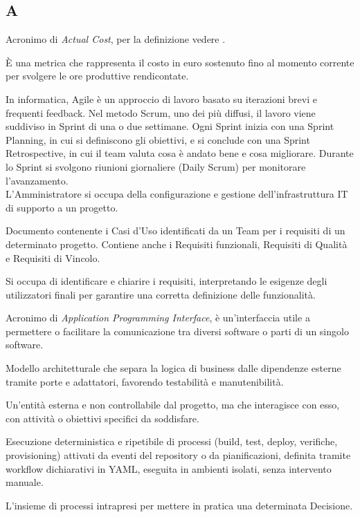 \begin{center}
\section*{A}
\end{center}

Acronimo di \textit{Actual Cost}, per la definizione vedere .

È una metrica che rappresenta il costo in euro sostenuto fino al momento corrente per svolgere le ore produttive rendicontate.

In informatica, Agile è un approccio di lavoro basato su iterazioni brevi e frequenti feedback. Nel metodo Scrum, uno dei più diffusi, il lavoro viene suddiviso in Sprint di una o due settimane. Ogni Sprint inizia con una Sprint Planning, in cui si definiscono gli obiettivi, e si conclude con una Sprint Retrospective, in cui il team valuta cosa è andato bene e cosa migliorare. Durante lo Sprint si svolgono riunioni giornaliere (Daily Scrum) per monitorare l’avanzamento.\\

L'Amministratore si occupa della configurazione e gestione dell'infrastruttura IT di supporto a un progetto.

Documento contenente i Casi d'Uso identificati da un Team per i requisiti di un determinato progetto. Contiene anche i Requisiti funzionali, Requisiti di Qualità e Requisiti di Vincolo.

Si occupa di identificare e chiarire i requisiti, interpretando le esigenze degli utilizzatori finali per garantire una corretta definizione delle funzionalità.

Acronimo di \textit{Application Programming Interface}, è un'interfaccia utile a permettere o facilitare la comunicazione tra diversi software o parti di un singolo software.

Modello architetturale che separa la logica di business dalle dipendenze esterne tramite porte e adattatori, favorendo testabilità e manutenibilità.

Un'entità esterna e non controllabile dal progetto, ma che interagisce con esso, con attività o obiettivi specifici da soddisfare.

Esecuzione deterministica e ripetibile di processi (build, test, deploy, verifiche, provisioning) attivati da eventi del repository o da pianificazioni, definita tramite workflow dichiarativi in YAML, eseguita in ambienti isolati, senza intervento manuale.

L'insieme di processi intrapresi per mettere in pratica una determinata Decisione.

